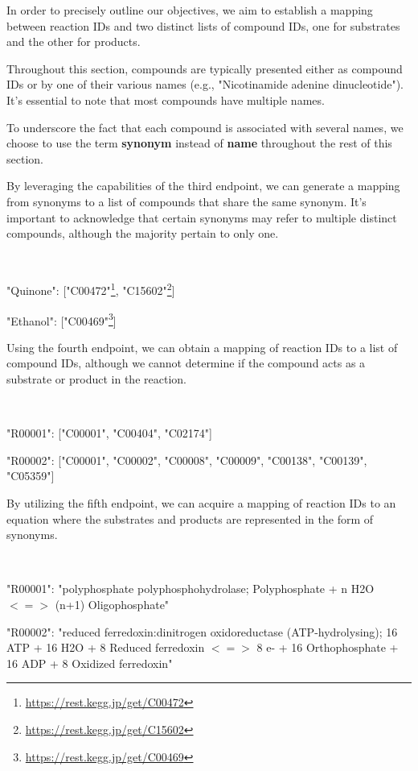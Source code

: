 In order to precisely outline our objectives, we aim to establish a mapping between reaction IDs and two distinct lists of compound IDs, one for substrates and the other for products.

Throughout this section, compounds are typically presented either as compound IDs or by one of their various names (e.g., "Nicotinamide adenine dinucleotide"). It's essential to note that most compounds have multiple names.

To underscore the fact that each compound is associated with several names, we choose to use the term \textbf{synonym} instead of \textbf{name} throughout the rest of this section.

By leveraging the capabilities of the third endpoint, we can generate a mapping from synonyms to a list of compounds that share the same synonym. It's important to acknowledge that certain synonyms may refer to multiple distinct compounds, although the majority pertain to only one.
\begin{exmp}~

    "Quinone": ["C00472"\footnote{\href{https://rest.kegg.jp/get/C00472}{https://rest.kegg.jp/get/C00472}}, "C15602"\footnote{\href{https://rest.kegg.jp/get/C15602}{https://rest.kegg.jp/get/C15602}}]
    
    "Ethanol": ["C00469"\footnote{\href{https://rest.kegg.jp/get/C00469}{https://rest.kegg.jp/get/C00469}}]
\end{exmp}

Using the fourth endpoint, we can obtain a mapping of reaction IDs to a list of compound IDs, although we cannot determine if the compound acts as a substrate or product in the reaction.
\begin{exmp}~

    "R00001": ["C00001", "C00404", "C02174"]

    "R00002": ["C00001", "C00002", "C00008", "C00009", "C00138", "C00139", "C05359"]
\end{exmp}

By utilizing the fifth endpoint, we can acquire a mapping of reaction IDs to an equation where the substrates and products are represented in the form of synonyms.
\begin{exmp}~

    "R00001": "polyphosphate polyphosphohydrolase; Polyphosphate + n H2O $<=>$ (n+1) Oligophosphate"
    
    "R00002": "reduced ferredoxin:dinitrogen oxidoreductase (ATP-hydrolysing); 16 ATP + 16 H2O + 8 Reduced ferredoxin $<=>$ 8 e- + 16 Orthophosphate + 16 ADP + 8 Oxidized ferredoxin"
\end{exmp}

